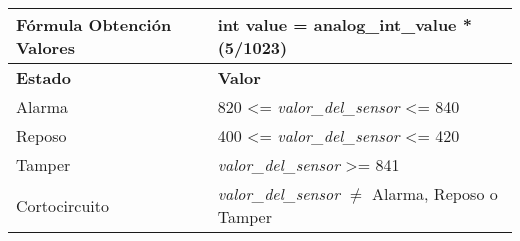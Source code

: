 \begin{tabular}{p{}p{}}
  \hline
  \textbf{Fórmula Obtención Valores} & int value = analog\_int\_value * (5/1023) \\
  \hline
\textbf{Estado} & \textbf{Valor} \\
\hline
Alarma & 820 <= \textit{valor\_del\_sensor} <= 840 \\
Reposo & 400 <= \textit{valor\_del\_sensor} <= 420 \\
Tamper & \textit{valor\_del\_sensor} >= 841 \\
Cortocircuito & \textit{valor\_del\_sensor} $\neq$ Alarma, Reposo o Tamper \\
\hline
\end{tabular}